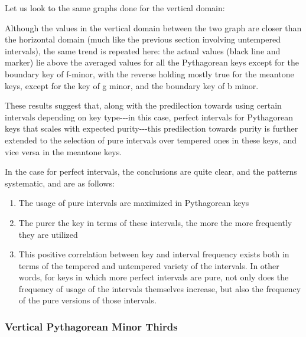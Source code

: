 Let us look to the same graphs done for the vertical domain:


    \begin{center}
    \end{center}
    


    \begin{center}
    \end{center}
    
    Although the values in the vertical domain between the two graph are
closer than the horizontal domain (much like the previous section
involving untempered intervals), the same trend is repeated here: the
actual values (black line and marker) lie above the averaged values for
all the Pythagorean keys except for the boundary key of f-minor, with
the reverse holding mostly true for the meantone keys, except for the
key of g minor, and the boundary key of b minor.

These results suggest that, along with the predilection towards using
certain intervals depending on key type-\/-\/-in this case, perfect
intervals for Pythagorean keys that scales with expected
purity-\/-\/-this predilection towards purity is further extended to the
selection of pure intervals over tempered ones in these keys, and vice
versa in the meantone keys.

In the case for perfect intervals, the conclusions are quite clear, and
the patterns systematic, and are as follows:

\begin{enumerate}
\def\labelenumi{\arabic{enumi}.}
\tightlist
\item
  The usage of pure intervals are maximized in Pythagorean keys
\item
  The purer the key in terms of these intervals, the more the more
  frequently they are utilized
\item
  This positive correlation between key and interval frequency exists
  both in terms of the tempered and untempered variety of the intervals.
  In other words, for keys in which more perfect intervals are pure, not
  only does the frequency of usage of the intervals themselves increase,
  but also the frequency of the pure versions of those intervals.
\end{enumerate}

    \subsubsection{Vertical Pythagorean Minor
Thirds}\label{vertical-pythagorean-minor-thirds}


